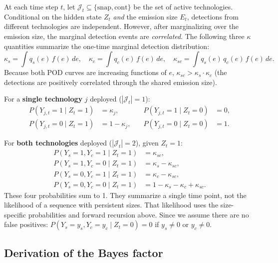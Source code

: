 \documentclass[11pt]{article}
\begin{document}
At each time step $t$, let $\mathcal{J}_t \subseteq \{\text{snap}, \text{cont}\}$ be the set of active technologies. Conditional on the hidden state $Z_t$ \emph{and} the emission size $E_t$, detections from different technologies are independent. However, after marginalizing over the emission size, the marginal detection events are \emph{correlated}. The following three $\kappa$ quantities summarize the one-time marginal detection distribution:
\begin{equation}
    \kappa_s = \int q_s(e)\, f(e)\, de, \quad
    \kappa_c = \int q_c(e)\, f(e)\, de, \quad
    \kappa_{sc} = \int q_s(e)\, q_c(e)\, f(e)\, de.
\end{equation}
Because both POD curves are increasing functions of $e$, $\kappa_{sc} > \kappa_s \cdot \kappa_c$ (the detections are positively correlated through the shared emission size).

For a \textbf{single technology} $j$ deployed ($|\mathcal{J}_t| = 1$):
\begin{align}
    P(Y_{j,t} = 1 \mid Z_t = 1) &= \kappa_j, &\quad P(Y_{j,t} = 1 \mid Z_t = 0) &= 0, \\
    P(Y_{j,t} = 0 \mid Z_t = 1) &= 1 - \kappa_j, &\quad P(Y_{j,t} = 0 \mid Z_t = 0) &= 1.
\end{align}

For \textbf{both technologies} deployed ($|\mathcal{J}_t| = 2$), given $Z_t = 1$:
\begin{align}
    P(Y_s{=}1, Y_c{=}1 \mid Z_t{=}1) &= \kappa_{sc}, \\
    P(Y_s{=}1, Y_c{=}0 \mid Z_t{=}1) &= \kappa_s - \kappa_{sc}, \\
    P(Y_s{=}0, Y_c{=}1 \mid Z_t{=}1) &= \kappa_c - \kappa_{sc}, \\
    P(Y_s{=}0, Y_c{=}0 \mid Z_t{=}1) &= 1 - \kappa_s - \kappa_c + \kappa_{sc}.
\end{align}
These four probabilities sum to 1. They summarize a single time point, not the likelihood of a sequence with persistent sizes. That likelihood uses the size-specific probabilities and forward recursion above. Since we assume there are no false positives: $P(Y_s{=}y_s, Y_c{=}y_c \mid Z_t{=}0) = 0$ if $y_s\neq0$ or $y_c\neq 0$.


\subsection{Derivation of the Bayes factor}
\label{sec:bayes_factor}
\end{document}
